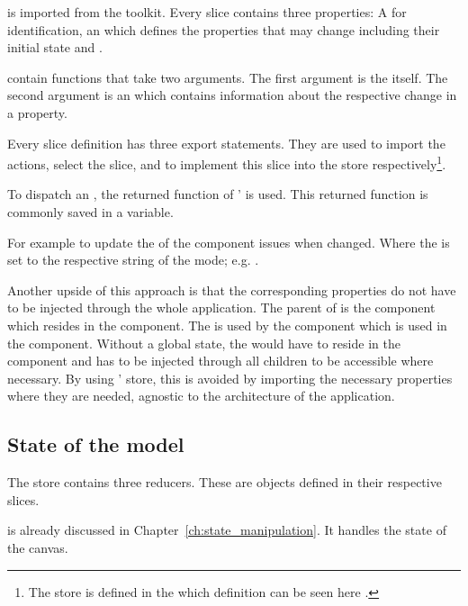  is imported from the  toolkit.
Every slice contains three properties: A  for identification, an  which defines the properties that may change including their initial state and .

 contain functions that take two arguments.
The first argument is the  itself.
The second argument is an  which contains information about the respective change in a  property.

Every slice definition has three export statements.
They are used to import the actions, select the slice, and to implement this slice into the store respectively\footnote{The store is defined in the  which definition can be seen here .}.

To dispatch an , the returned function of '  is used.
This returned function is commonly saved in a  variable.

For example to update the  of  the  component issues  when changed.
Where the  is set to the respective string of the mode; e.g. .

Another upside of this approach is that the corresponding properties do not have to be injected through the whole application.
The parent of  is the  component which resides in the  component.
The  is used by the  component which is used in the  component.
Without a global state, the  would have to reside in the  component and has to be injected through all children to be accessible where necessary.
By using ' store, this is avoided by importing the necessary properties where they are needed, agnostic to the architecture of the application.

\subsection{State of the  model}\label{ch:state_mec2_model}

The store contains three reducers.
These are objects defined in their respective slices.

 is already discussed in Chapter~\ref{ch:state_manipulation}.
It handles the state of the canvas.

